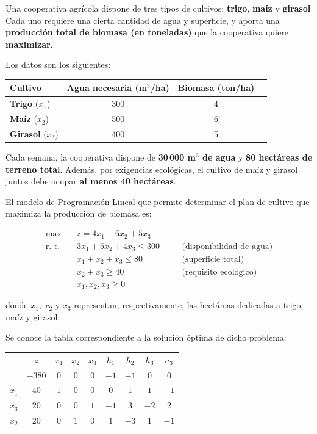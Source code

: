 Una cooperativa agrícola dispone de tres tipos de cultivos: \textbf{trigo}, \textbf{maíz}  y \textbf{girasol}  
Cada uno requiere una cierta cantidad de agua y superficie, y aporta una \textbf{producción total de biomasa (en toneladas)} que la cooperativa quiere \textbf{maximizar}.

Los datos son los siguientes:

\begin{center}
\begin{tabular}{lccc}
\toprule
\textbf{Cultivo} & \textbf{Agua necesaria (m$^3$/ha)} & \textbf{Biomasa (ton/ha)} \\
\midrule
\textbf{Trigo} ($x_1$) & 300 & 4 \\
\textbf{Maíz} ($x_2$) & 500 & 6 \\
\textbf{Girasol} ($x_3$) & 400 & 5 \\
\bottomrule
\end{tabular}
\end{center}

Cada semana, la cooperativa dispone de \textbf{30\,000 m$^3$ de agua} y \textbf{80 hectáreas de terreno total}.  
Además, por exigencias ecológicas, el cultivo de maíz y girasol juntos debe ocupar \textbf{al menos 40 hectáreas}.

El modelo de Programación Lineal que permite determinar el plan de cultivo que maximiza la producción de biomasa es:

\[
\begin{aligned}
\max \quad & z = 4x_1 + 6x_2 + 5x_3 \\
\text{r. t.} \quad 
& 3x_1 + 5x_2 + 4x_3 \le 300 \quad && \text{(disponibilidad de agua)} \\
& x_1 + x_2 + x_3 \le 80 \quad && \text{(superficie total)} \\
& x_2 + x_3 \ge 40 \quad && \text{(requisito ecológico)} \\
& x_1, x_2, x_3 \ge 0
\end{aligned}
\]

donde $x_1$, $x_2$ y $x_3$ representan, respectivamente, las hectáreas dedicadas a trigo, maíz y girasol,

Se conoce la tabla correspondiente a la solución óptima de dicho problema:

\begin{center}
\begin{tabular}{c|c|ccccccc|}
 & $z$ & $x_1$ & $x_2$ & $x_3$ & $h_1$ & $h_2$ & $h_3$ & $a_3$\\ 
      & $-380$ & $0$ & $0$ & $0$ & $-1$ & $-1$ & $0$ & $0$ \\ 
\hline
$x_1$ & 40  & $1$ & $0$ & $0$ & $0$ & $1$ & $1$ & $-1$\\ 
$x_3$ & 20  & $0$ & $0$ & $1$ & $-1$ & $3$ & $-2$ & $2$\\ 
$x_2$ & 20  & $0$ & $1$ & $0$ & $1$ & $-3$ & $1$ & $-1$\\ 
\hline
\end{tabular}
\end{center}
 
